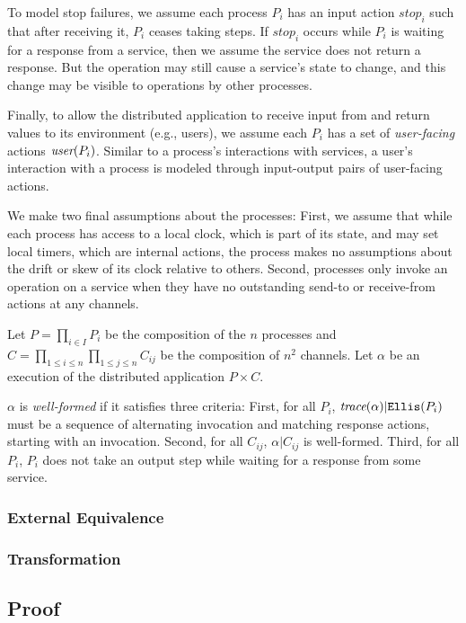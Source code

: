 To model stop failures, we assume each process $P_i$ has an input
action $\textit{stop}_i$ such that after receiving it, $P_i$ ceases taking
steps. If $\textit{stop}_i$ occurs while $P_i$ is waiting for a response from a service, then we assume the service does not return a response. But the operation may still cause a service's state to change, and this change may be visible to operations by other processes.

Finally, to allow the distributed application to receive input from and return values to its environment (e.g., users), we assume each $P_i$ has a set of \textit{user-facing} actions $\operatorname*{\textit{user}}(P_i)$. Similar to a process's interactions with services, a user's interaction with a process is modeled through input-output pairs of user-facing actions.

We make two final assumptions about the processes: First, we assume that while
each process has access to a local clock, which is part of its state, and may
set local timers, which are internal actions, the process makes no assumptions
about the drift or skew of its clock relative to others. Second, processes only
invoke an operation on a service when they have no outstanding send-to or
receive-from actions at any channels.

Let $P = \prod_{i \in I} P_i$ be the composition of the $n$ processes and
$C = \prod_{1 \leq i \leq n} \prod_{1 \leq j \leq n} C_{ij}$ be the composition of $n^2$ channels.
Let $\alpha$ be an execution of the distributed application $P \times C$.

$\alpha$ is \textit{well-formed} if it satisfies three criteria:
First, for all $P_i$, $\operatorname*{\textit{trace}}(\alpha) | \texttt{Ellis}(P_i)$ must be a sequence of alternating invocation and matching response actions, starting with an invocation. Second, for all $C_{ij}$, $\alpha | C_{ij}$ is well-formed. Third, for all $P_i$, $P_i$ does not take an output step while waiting for a response from some service. 

\subsubsection{External Equivalence}
\label{sec:equivalence:preliminaries:equivalence}

\subsubsection{Transformation}
\label{sec:equivalence:preliminaries:transform}

\subsection{Proof}
\label{sec:equivalence:proof}

